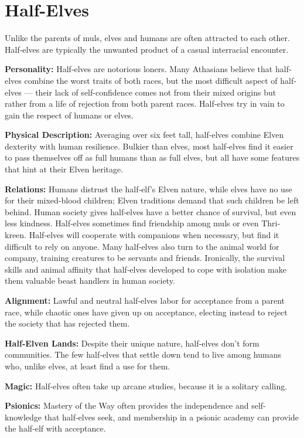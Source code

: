 \section{Half-Elves}
Unlike the parents of muls, elves and humans are often attracted to each other. Half‐elves are typically the unwanted product of a casual interracial encounter.

\textbf{Personality:} Half‐elves are notorious loners. Many Athasians believe that half‐elves combine the worst traits of both races, but the most difficult aspect of half‐elves --- their lack of self-confidence comes not from their mixed origins but rather from a life of rejection from both parent races. Half‐elves try in vain to gain the respect of humans or elves.

\textbf{Physical Description:} Averaging over six feet tall, half‐elves combine Elven dexterity with human resilience. Bulkier than elves, most half‐elves find it easier to pass themselves off as full humans than as full elves, but all have some features that hint at their Elven heritage.

\textbf{Relations:} Humans distrust the half‐elf's Elven nature, while elves have no use for their mixed-blood children; Elven traditions demand that such children be left behind. Human society gives half‐elves have a better chance of survival, but even less kindness. Half‐elves sometimes find friendship among muls or even Thri‐kreen. Half‐elves will cooperate with companions when necessary, but find it difficult to rely on anyone. Many half‐elves also turn to the animal world for company, training creatures to be servants and friends. Ironically, the survival skills and animal affinity that half‐elves developed to cope with isolation make them valuable beast handlers in human society.

\textbf{Alignment:} Lawful and neutral half‐elves labor for acceptance from a parent race, while chaotic ones have given up on acceptance, electing instead to reject the society that has rejected them.

\textbf{Half‐Elven Lands:} Despite their unique nature, half‐elves don't form communities. The few half‐elves that settle down tend to live among humans who, unlike elves, at least find a use for them.

\textbf{Magic:} Half‐elves often take up arcane studies, because it is a solitary calling.

\textbf{Psionics:} Mastery of the Way often provides the independence and self-knowledge that half‐elves seek, and membership in a psionic academy can provide the half‐elf with acceptance.

